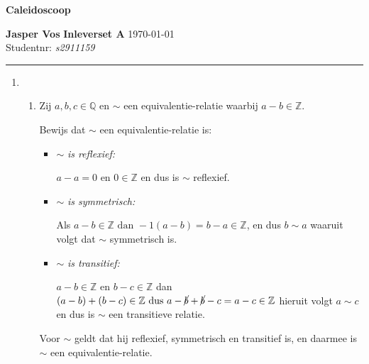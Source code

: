 \documentclass{article}
\newcommand{\tx}[1]{\text{#1}}
\newcommand{\cn}[1]{\cancel{#1}}
\newcommand{\Z}{\mathbb{Z}}
\newcommand{\Q}{\mathbb{Q}}
\newcommand{\en}{\tx{ en }}
\newcommand{\dan}{\tx{ dan }}
\newcommand{\dus}{\tx{ dus }}
\begin{document}
{\Large \textbf{Caleidoscoop}}

\bigskip

\textbf{Jasper Vos} \hfill \textbf{Inleverset A} \hfill \today \\
Studentnr: \emph{s2911159}

\rule{\textwidth}{2pt}

\bigskip

\begin{enumerate}[label=\arabic*]
    \item
          \begin{enumerate}[label=\alph*)]
              \item
                    Zij \(a, b, c \in \Q \) en \(\sim\) een equivalentie-relatie waarbij \(a - b \in \Z\).

                    Bewijs dat \(\sim\) een equivalentie-relatie is:
                    \begin{itemize}
                        \item \(\sim\)\emph{ is reflexief:}

                              \(a - a = 0 \en 0 \in \Z \) en dus is \(\sim\) reflexief.
                        \item \(\sim\)\emph{ is symmetrisch:}

                              Als \(a - b \in \Z \dan -1(a - b) = b - a \in \Z\), en dus \(b \sim a\) waaruit volgt dat \(\sim\) symmetrisch is.
                        \item \(\sim\)\emph{ is transitief:}

                              \(a-b \in \Z \en b-c \in \Z\) dan \((a-b) + (b-c) \in \Z \dus a -\cn{b} + \cn{b} - c = a-c \in \Z \)
                              hieruit volgt \(a \sim c\) en dus is \(\sim\) een transitieve relatie.
                    \end{itemize}
                    Voor \(\sim\) geldt dat hij reflexief, symmetrisch en transitief is, en daarmee
                    is \(\sim\) een equivalentie-relatie.


\end{enumerate}
\end{enumerate}
\end{document}
